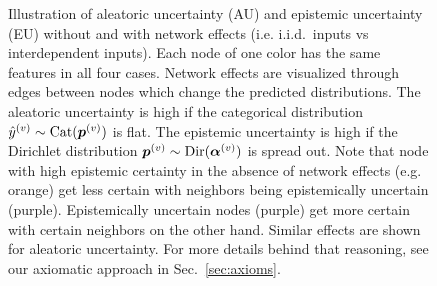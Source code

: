 \begin{figure}[!h]
	\caption{Illustration of aleatoric uncertainty (AU) and epistemic uncertainty (EU) without and with network effects (i.e. i.i.d.\ inputs vs interdependent inputs). Each node of one color has the same features in all four cases. Network effects are visualized through edges between nodes which change the predicted distributions. The aleatoric uncertainty is high if the categorical distribution $\hat{y} ^{(v)} \sim \operatorname{Cat}(\bm{p}^{(v)})$ is flat. The epistemic uncertainty is high if the Dirichlet distribution $\bm{p}^{(v)} \sim \operatorname{Dir}(\bm{\alpha}^{(v)})$ is spread out. Note that node with high epistemic certainty in the absence of network effects (e.g. orange) get less certain with neighbors being epistemically uncertain (purple). Epistemically uncertain nodes (purple) get more certain with certain neighbors on the other hand. Similar effects are shown for aleatoric uncertainty. For more details behind that reasoning, see our axiomatic approach in Sec.~\ref{sec:axioms}.}
    \label{fig:uncertainty_types_large}
\end{figure}

\clearpage